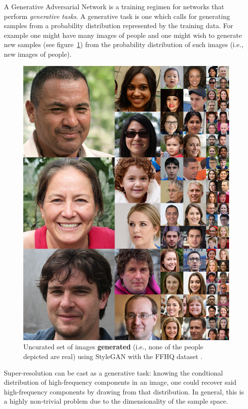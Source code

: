 A Generative Adversarial Network \cite{goodfellow2014generative} is a training regimen for networks that perform \textit{generative tasks}.
%
A generative task is one which calls for generating samples from a probability distribution represented by the training data.
%
For example one might have many images of people and one might wish to generate new samples (see figure~\ref{fig:stylegan}) from the probability distribution of such images (i.e., new images of people).
\begin{figure}[!htbp]
    \centering
    \begin{adjustbox}{width=\linewidth}
        \centering
        \includegraphics[]{figures/neural_networks/stylegan.jpg}
    \end{adjustbox}
    \caption{Uncurated set of images \textbf{generated} (i.e., none of the people depicted are real) using StyleGAN with the FFHQ dataset \cite{karras2018stylebased}.}\label{fig:stylegan}
\end{figure}
%
Super-resolution can be cast as a generative task: knowing the condtional distribution of high-frequency components in an image, one could recover said high-frequency components by drawing from that distribution.
%
In general, this is a highly non-trivial problem due to the dimensionality of the sample space.

